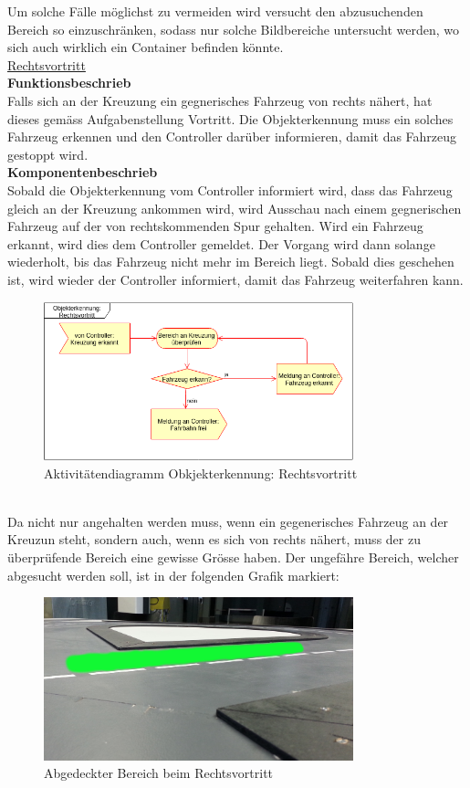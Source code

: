 Um solche Fälle möglichst zu vermeiden wird versucht den abzusuchenden Bereich so einzuschränken, sodass nur solche Bildbereiche untersucht werden, wo sich auch wirklich ein Container befinden könnte. 
\\[0.2cm]
\underline{Rechtsvortritt}
\\[0.2cm]
\textbf{Funktionsbeschrieb}\\
Falls sich an der Kreuzung ein gegnerisches Fahrzeug von rechts nähert, hat dieses gemäss Aufgabenstellung Vortritt. Die Objekterkennung muss ein solches Fahrzeug erkennen und den Controller darüber informieren, damit das Fahrzeug gestoppt wird.
\\[0.2cm]
\textbf{Komponentenbeschrieb}\\
Sobald die Objekterkennung vom Controller informiert wird, dass das Fahrzeug gleich an der Kreuzung ankommen wird, wird Ausschau nach einem gegnerischen Fahrzeug auf der von rechtskommenden Spur gehalten. Wird ein Fahrzeug erkannt, wird dies dem Controller gemeldet. Der Vorgang wird dann solange wiederholt, bis das Fahrzeug nicht mehr im Bereich liegt. Sobald dies geschehen ist, wird wieder der Controller informiert, damit das Fahrzeug weiterfahren kann.
\begin{figure}[H]%
\centering
\includegraphics[width=0.8\textwidth]{03_Loesungskonzept/pictures/objekterkennung_rechtsvortritt.png}
\caption{Aktivitätendiagramm Obkjekterkennung: Rechtsvortritt}
\label{fig:activityRechtsvortritt}
\end{figure} \\
Da nicht nur angehalten werden muss, wenn ein gegenerisches Fahrzeug an der Kreuzun steht, sondern auch, wenn es sich von rechts nähert, muss der zu überprüfende Bereich eine gewisse Grösse haben. Der ungefähre Bereich, welcher abgesucht werden soll, ist in der folgenden Grafik markiert:
\begin{figure}[H]%
\centering
\includegraphics[width=0.8\textwidth]{03_Loesungskonzept/pictures/rechtsvortritt_bereich.jpg}
\caption{Abgedeckter Bereich beim Rechtsvortritt}
\label{fig:bereichRechtsvortritt}
\end{figure}
